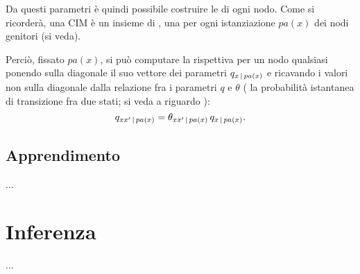 Da questi parametri è quindi possibile costruire le \cim{} di ogni nodo. Come si ricorderà, una \acs{CIM} è un insieme di \im{}, una per ogni istanziazione $pa(x)$ dei nodi genitori (si veda).

Perciò, fissato $pa(x)$, si può computare la rispettiva \im*{} per un nodo qualsiasi ponendo sulla diagonale il suo vettore dei parametri $q_{x\,\arrowvert\,pa(x)}$ e ricavando i valori non sulla diagonale dalla relazione fra i parametri $q$ e $\theta$ (\ie{} la probabilità istantanea di transizione fra due stati; si veda a riguardo ):
\[
q_{xx^\prime\,\arrowvert\,pa(x)}=\theta_{xx^\prime\,\arrowvert\,pa(x)}\,q_{x\,\arrowvert\,pa(x)}\text{.}
\]

\subsection{Apprendimento}
\label{sec:ctbn-learning}
...

\section{Inferenza}
\label{sec:ctbn-inferenza}
...









